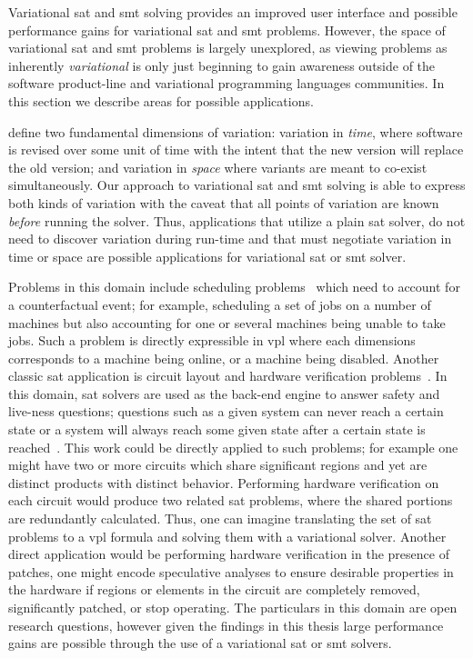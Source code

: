 \label{section:conclusion:applications}
%
Variational \ac{sat} and \ac{smt} solving provides an improved user interface
and possible performance gains for variational \ac{sat} and \ac{smt} problems.
However, the space of variational \ac{sat} and \ac{smt} problems is largely
unexplored, as viewing problems as inherently \emph{variational} is only just
beginning to gain awareness outside of the software product-line and variational
programming languages communities. In this section we describe areas for
possible applications.

\citet{TTS+:VariVolution19} define two fundamental dimensions of variation:
variation in \emph{time}, where software is revised over some unit of time with
the intent that the new version will replace the old version; and variation in
\emph{space} where variants are meant to co-exist simultaneously. Our approach
to variational \ac{sat} and \ac{smt} solving is able to express both kinds of
variation with the caveat that all points of variation are known \emph{before}
running the solver. Thus, applications that utilize a plain \ac{sat} solver, do
not need to discover variation during run-time and that must negotiate variation
in time or space are possible applications for variational \ac{sat} or \ac{smt}
solver.

Problems in this domain include scheduling problems~\cite{BBH+09} which need to
account for a counterfactual event; for example, scheduling a set of jobs on a
number of machines but also accounting for one or several machines being unable
to take jobs. Such a problem is directly expressible in \ac{vpl} where each
dimensions corresponds to a machine being online, or a machine being disabled.
Another classic \ac{sat} application is circuit layout and hardware verification
problems~\cite{BBH+09}. In this domain, \ac{sat} solvers are used as the
back-end engine to answer safety and live-ness questions; questions such as a
given system can never reach a certain state or a system will always reach some
given state after a certain state is reached~\cite{BBH+09}. This work could be
directly applied to such problems; for example one might have two or more
circuits which share significant regions and yet are distinct products with
distinct behavior. Performing hardware verification on each circuit would
produce two related \ac{sat} problems, where the shared portions are redundantly
calculated. Thus, one can imagine translating the set of \ac{sat} problems to a
\ac{vpl} formula and solving them with a variational solver. Another direct
application would be performing hardware verification in the presence of
patches, one might encode speculative analyses to ensure desirable properties in
the hardware if regions or elements in the circuit are completely removed,
significantly patched, or stop operating. The particulars in this domain are
open research questions, however given the findings in this thesis large
performance gains are possible through the use of a variational \ac{sat} or
\ac{smt} solvers.

